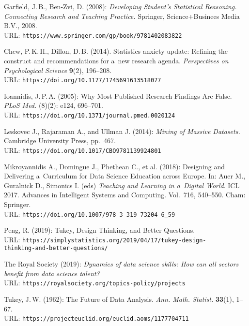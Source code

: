 \begin{thebibliography}{10}
    Garfield, J.\,B., Ben-Zvi, D. (2008): {\it Developing Student's Statistical Reasoning. 
    Connecting Research and Teaching Practice.}  
     Springer, Science+Businees Media B.V., 2008.
		 \\
		 URL: {\tt https://www.springer.com/gp/book/9781402083822}

    Chew, P.\,K.\,H., Dillon, D.\,B. (2014). Statistics anxiety update: Refining the construct and recommendations for a~new research agenda. {\it Perspectives on Psychological Science} {\bf 9}(2), 196--208. 
		\\
    URL: {\tt https://doi.org/10.1177/1745691613518077}

    Ioannidis, J.\,P.\,A. (2005): Why Most Published Research Findings Are False. {\it PLoS Med.} {\bf }(8)(2): e124, 696--701.
		\\
    URL: {\tt https://doi.org/10.1371/journal.pmed.0020124}
    
      Leskovec J., Rajaraman A., and Ullman J. (2014): {\it  Mining of Massive Datasets.} Cambridge University Press,  pp.~467. 
			\\
     URL: {\tt https://doi.org/10.1017/CBO9781139924801}
    
     Mikroyannidis A., Domingue J., Phethean C., et al. (2018): Designing and Delivering a~Curriculum for Data Science Education across Europe.  In: Auer M., Guralnick D., Simonics I. (eds) {\it Teaching and Learning in a~Digital World}. ICL 2017. Advances in Intelligent Systems and Computing. Vol.~716, 540--550. Cham: Springer.
		 \\
		 URL: {\tt https://doi.org/10.1007/978-3-319-73204-6\_59}
		 
Peng, R. (2019): Tukey, Design Thinking, and Better Questions.
		 \\
     URL: {\tt https://simplystatistics.org/2019/04/17/tukey-design-}\\{\tt thinking-and-better-questions/}

    The Royal Society (2019): {\it Dynamics of data science skills: How can all sectors benefit from data  science talent?} 
		\\
    URL: {\tt https://royalsociety.org/topics-policy/projects}

    Tukey, J.\,W. (1962): The Future of Data Analysis.
    {\it  Ann. Math. Statist.} {\bf 33}(1), 1--67. 
		\\
    URL: {\tt https://projecteuclid.org/euclid.aoms/1177704711}


\end{thebibliography}
